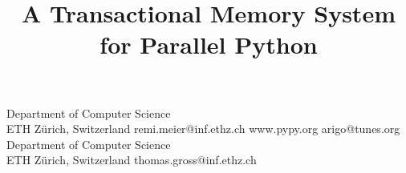 \documentclass{sigplanconf}
\begin{document}
\setlength{\pdfpageheight}{\paperheight}
\setlength{\pdfpagewidth}{\paperwidth}






\title{A Transactional Memory System for Parallel Python}



           {Department of Computer Science\\ ETH Zürich, Switzerland}
           {remi.meier@inf.ethz.ch}
           {www.pypy.org}
           {arigo@tunes.org}
           {Department of Computer Science\\ ETH Zürich, Switzerland}
           {thomas.gross@inf.ethz.ch}

\maketitle
\end{document}
